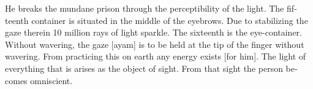 \begin{otherlanguage}{english}
\begin{tlate}
 He breaks the mundane prison through the perceptibility of the light.
 The fifteenth container is situated in the middle of the eyebrows. Due to stabilizing the gaze therein 10 million rays of light sparkle.
 The sixteenth is the eye-container. Without wavering, the gaze [ayam] is to be held at the tip of the finger without wavering. From practicing this on earth any energy exists [for him]. The light of everything that is arises as the object of sight. From that sight the person becomes omniscient. 
\end{tlate}
\end{otherlanguage}